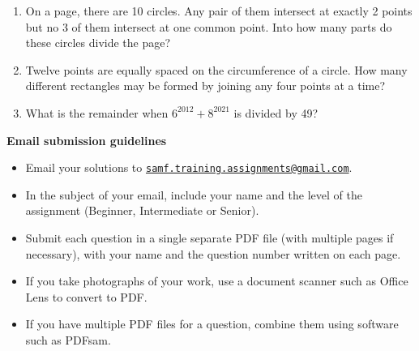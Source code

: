 \documentclass{article}
\begin{document}
\begin{enumerate}[1.]
\vspace{6pt}
\item %
On a page, there are 10 circles. Any pair of them intersect at exactly 2 points but no 3 of
them intersect at one common point. Into how many parts do these circles divide the page?

\vspace{6pt}
\item %
Twelve points are equally spaced on the circumference of a circle. How many different rectangles may be formed by joining any four points at a time?

\vspace{6pt}
\item %
What is the remainder when $6^{2012} + 8^{2021}$ is divided by 49?

\end{enumerate}

\vspace{8pt}
\textbf{\Large Email submission guidelines}
\begin{itemize}
	\item Email your solutions to \href{mailto:samf.training.assignments@gmail.com}{\texttt{samf.training.assignments@gmail.com}}.
	\item In the subject of your email, include your name and the level of the assignment (Beginner, Intermediate or Senior).
	\item Submit each question in a single separate PDF file (with multiple pages if necessary), with your name and the question number written on each page.
	\item If you take photographs of your work, use a document scanner such as Office Lens to convert to PDF.
	\item If you have multiple PDF files for a question, combine them using software such as PDFsam.
\end{itemize}
\end{document}
